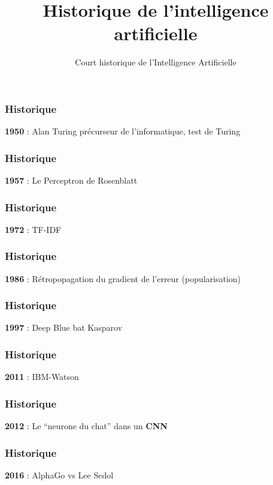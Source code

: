\documentclass{formation}
\title{Historique de l'intelligence artificielle}
\subtitle{Court historique de l'Intelligence Artificielle}
\begin{document}
\maketitle

\begin{frame}
  \frametitle{Historique}
  \textbf{1950} : Alan Turing
  précurseur de l'informatique, test de Turing
\end{frame}

\begin{frame}
  \frametitle{Historique}
  \textbf{1957} : Le Perceptron de Rosenblatt
\end{frame}

\begin{frame}
  \frametitle{Historique}
  \textbf{1972} :  TF-IDF
\end{frame}

\begin{frame}
  \frametitle{Historique}
  \textbf{1986} : Rétropopagation du gradient de l'erreur (popularisation)
\end{frame}

\begin{frame}
  \frametitle{Historique}
  \textbf{1997} : Deep Blue bat Kasparov
\end{frame}

\begin{frame}
  \frametitle{Historique}
  \textbf{2011} : IBM-Watson
\end{frame}

\begin{frame}
  \frametitle{Historique}
  \textbf{2012} : Le ``neurone du chat'' dans un \textbf{CNN}
\end{frame}

\begin{frame}
  \frametitle{Historique}
  \textbf{2016} : AlphaGo vs Lee Sedol
\end{frame}
\end{document}
